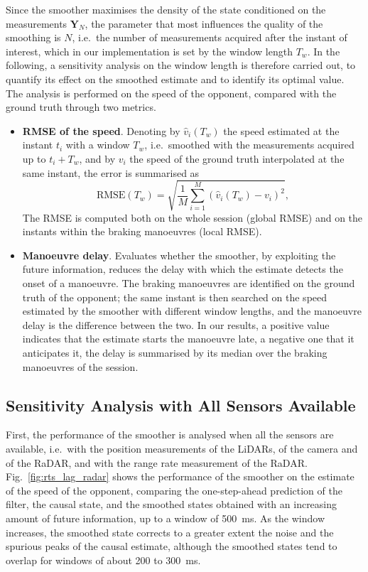 Since the smoother maximises the density of the state conditioned on the measurements
$\mathbf{Y}_N$, the parameter that most influences the quality of the smoothing is $N$, i.e.\
the number of measurements acquired after the instant of interest, which in our
implementation is set by the window length $T_w$. In the following, a sensitivity analysis
on the window length is therefore carried out, to quantify its effect on the smoothed
estimate and to identify its optimal value. The analysis is performed on the speed of the
opponent, compared with the ground truth through two metrics.
\begin{itemize}
    \item \textbf{RMSE of the speed}. Denoting by $\hat{v}_i(T_w)$ the speed estimated at
    the instant $t_i$ with a window $T_w$, i.e.\ smoothed with the measurements acquired up
    to $t_i + T_w$, and by $v_i$ the speed of the ground truth interpolated at the same
    instant, the error is summarised as
    \begin{equation}
        \mathrm{RMSE}(T_w) = \sqrt{\frac{1}{M}\sum_{i=1}^{M}\left(\hat{v}_i(T_w) - v_i\right)^2},
        \label{eq:rts_rmse}
    \end{equation}
    The RMSE is computed both on the whole session (global RMSE) and on the
    instants within the braking manoeuvres (local RMSE).

    \item \textbf{Manoeuvre delay}. Evaluates whether the smoother, by exploiting
    the future information, reduces the delay with which the estimate detects the onset of a
    manoeuvre. The braking manoeuvres are identified on the ground truth of the opponent; the same instant is then searched on the speed estimated by the smoother with different
    window lengths, and the manoeuvre delay is the difference between the two. In our results, a  positive value
    indicates that the estimate starts the manoeuvre late, a negative one that it anticipates
    it, the delay is summarised by its median over the braking manoeuvres of the session.
\end{itemize}

\subsection*{Sensitivity Analysis with All Sensors Available}

First, the performance of the smoother is analysed when all the sensors are available, i.e.\
with the position measurements of the LiDARs, of the camera and of the RaDAR, and with the
range rate measurement of the RaDAR. Fig.~\ref{fig:rts_lag_radar} shows the performance of
the smoother on the estimate of the speed of the opponent, comparing the one-step-ahead
prediction of the filter, the causal state, and the
smoothed states obtained with an increasing amount of future information, up to a window of
\SI{500}{ms}. As the window increases, the smoothed state corrects to a greater extent the
noise and the spurious peaks of the causal estimate, although the smoothed states tend to
overlap for windows of about 200 to \SI{300}{ms}.

